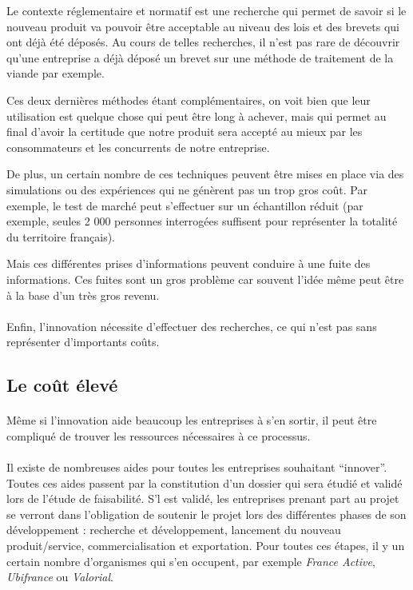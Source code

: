 \documentclass[a4paper,12pt]{report}
\begin{document}
		Le contexte réglementaire et normatif est une recherche qui permet de savoir si le nouveau produit va pouvoir être acceptable au niveau des lois et des brevets qui ont déjà été déposés. Au cours de telles recherches, il n'est pas rare de découvrir qu'une entreprise a déjà déposé un brevet sur une méthode de traitement de la viande par exemple.
		
		Ces deux dernières méthodes étant complémentaires, on voit bien que leur utilisation est quelque chose qui peut être long à achever, mais qui permet au final d'avoir la certitude que notre produit sera accepté au mieux par les consommateurs et les concurrents de notre entreprise.
		
		De plus, un certain nombre de ces techniques peuvent être mises en place via des simulations ou des expériences qui ne génèrent pas un trop gros coût. Par exemple, le test de marché peut s'effectuer sur un échantillon réduit (par exemple, seules 2 000 personnes interrogées suffisent pour représenter la totalité du territoire français).\cite{Probas}
		
		Mais ces différentes prises d’informations peuvent conduire à une fuite des informations. Ces fuites sont un gros problème car souvent l’idée même peut être à la base d’un très gros revenu.
		
		\paragraph{}Enfin, l'innovation nécessite d'effectuer des recherches, ce qui n'est pas sans représenter d'importants coûts. 
		
			
		\subsection{Le coût élevé}
		\paragraph{}Même si l'innovation aide beaucoup les entreprises à s'en sortir, il peut être compliqué de trouver les ressources nécessaires à ce processus.
		
		\paragraph{}Il existe de nombreuses aides pour toutes les entreprises souhaitant “innover”. Toutes ces aides passent par la constitution d’un dossier qui sera étudié et validé lors de l’étude de faisabilité. S'l est validé, les entreprises prenant part au projet se verront dans l’obligation de soutenir le projet lors des différentes phases de son développement : recherche et développement, lancement du nouveau produit/service, commercialisation et exportation. Pour toutes ces étapes, il y un certain nombre d’organismes qui s’en occupent, par exemple \textit{France Active}, \textit{Ubifrance} ou \textit{Valorial}\cite{AidesInnovation}. 
		
\end{document}
